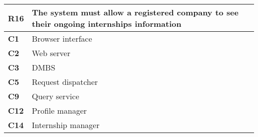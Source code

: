 \begin{table}[H]
    \centering
    \begin{tabular}{|l|m{10cm}|}
        \hline \textbf{R16} & The system must allow a registered company to see their ongoing internships information \\
        \hline \textbf{C1} & Browser interface \\
        \hline \textbf{C2} & Web server \\
        \hline \textbf{C3} & DMBS \\
        \hline \textbf{C5} & Request dispatcher \\
        \hline \textbf{C9} & Query service \\
        \hline \textbf{C12} & Profile manager \\
        \hline \textbf{C14} & Internship manager \\
        \hline
    \end{tabular}
\end{table}

